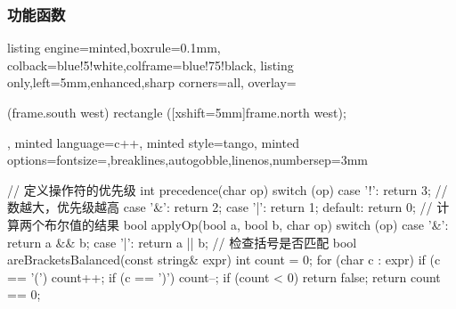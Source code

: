\documentclass[12pt]{article}
\begin{document}
\subsubsection{功能函数}
\begin{tcblisting}{listing engine=minted,boxrule=0.1mm,
colback=blue!5!white,colframe=blue!75!black,
listing only,left=5mm,enhanced,sharp corners=all,
overlay={\begin{tcbclipinterior} (frame.south west)
rectangle ([xshift=5mm]frame.north west);\end{tcbclipinterior}},
minted language=c++,
minted style=tango,
minted options={fontsize=\small,breaklines,autogobble,linenos,numbersep=3mm}}
// 定义操作符的优先级
int precedence(char op) {
    switch (op) {
        case '!': return 3; //数越大，优先级越高
        case '&': return 2;
        case '|': return 1;
        default: return 0;
    }
}     // 计算两个布尔值的结果
bool applyOp(bool a, bool b, char op) { 
    switch (op) {
        case '&': return a && b;
        case '|': return a || b;
    }
}      // 检查括号是否匹配
bool areBracketsBalanced(const string& expr) { 
    int count = 0;
    for (char c : expr) {
        if (c == '(') count++;
        if (c == ')') count--;
        if (count < 0) return false;
    }
    return count == 0;
}
\end{tcblisting}
\end{document}
